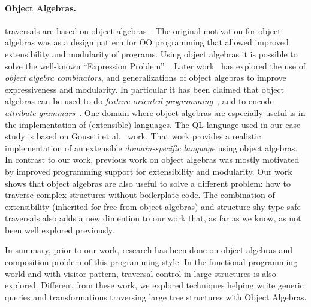 \paragraph{Object Algebras.} \name traversals are based on
object algebras~\cite{bruno12oa}. The original motivation for object
algebras was as a design pattern for OO programming that allowed
improved extensibility and modularity of programs.  Using object
algebras it is possible to solve the well-known ``Expression
Problem''~\cite{wadler98expression-problem}.  Later
work~\cite{oliveira13fop,rendel14attributes} has explored the use of
\emph{object algebra combinators}, and generalizations of object
algebras to improve expressiveness and modularity. In particular it
has been claimed that object algebras can be used to do
\emph{feature-oriented programming}~\cite{oliveira13fop}, and to
encode \emph{attribute grammars}~\cite{rendel14attributes}. One domain
where object algebras are especially useful is in the implementation
of (extensible) languages.  The QL language used in our case study is
based on Gouseti et al.~\cite{gouseti14extensible} work. That work
provides a realistic implementation of an extensible
\emph{domain-specific language} using object algebras. In contrast to
our work, previous work on object algebras was mostly motivated by
improved programming support for extensibility and modularity. Our
work shows that object algebras are also useful to solve a different
problem: how to traverse complex structures without boilerplate
code. The combination of extensibility (inherited for free from object
algebras) and structure-shy type-safe traversals also adds a new
dimention to our work that, as far as we know, as not been well explored
previously.

In summary, prior to our work, research has been done on object
algebras and composition problem of this programming style. In the
functional programming world and with visitor pattern, traversal
control in large structures is also explored. Different from these
work, we explored techniques helping write generic queries and
transformations traversing large tree structures with Object Algebras.

